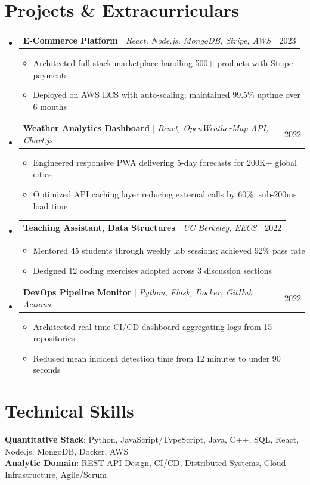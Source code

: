 \documentclass[letterpaper,11pt]{article}
\makeatletter
\newcommand{\resumeItem}[1]{
  \item\small{{#1 \vspace{-2pt}}}
}
\newcommand{\resumeProjectHeading}[2]{
    \item
    \begin{tabular*}{0.97\textwidth}{l@{\extracolsep{\fill}}r}
      \small#1 & #2 \\
    \end{tabular*}\vspace{-7pt}
}
\newcommand{\resumeSubHeadingListStart}{\begin{itemize}[leftmargin=0.15in, label={}]}
\newcommand{\resumeSubHeadingListEnd}{\end{itemize}}
\newcommand{\resumeItemListStart}{\begin{itemize}}
\newcommand{\resumeItemListEnd}{\end{itemize}\vspace{-5pt}}
\makeatother
\begin{document}
\section{Projects \& Extracurriculars}
    \resumeSubHeadingListStart
  \resumeProjectHeading
    {\textbf{E-Commerce Platform} $|$ \emph{React, Node.js, MongoDB, Stripe, AWS}}{2023}
    \resumeItemListStart
      \resumeItem{Architected full-stack marketplace handling 500+ products with Stripe payments}
      \resumeItem{Deployed on AWS ECS with auto-scaling; maintained 99.5\% uptime over 6 months}
    \resumeItemListEnd

  \resumeProjectHeading
    {\textbf{Weather Analytics Dashboard} $|$ \emph{React, OpenWeatherMap API, Chart.js}}{2022}
    \resumeItemListStart
      \resumeItem{Engineered responsive PWA delivering 5-day forecasts for 200K+ global cities}
      \resumeItem{Optimized API caching layer reducing external calls by 60\%; sub-200ms load time}
    \resumeItemListEnd

  \resumeProjectHeading
    {\textbf{Teaching Assistant, Data Structures} $|$ \emph{UC Berkeley, EECS}}{2022}
    \resumeItemListStart
      \resumeItem{Mentored 45 students through weekly lab sessions; achieved 92\% pass rate}
      \resumeItem{Designed 12 coding exercises adopted across 3 discussion sections}
    \resumeItemListEnd

  \resumeProjectHeading
    {\textbf{DevOps Pipeline Monitor} $|$ \emph{Python, Flask, Docker, GitHub Actions}}{2022}
    \resumeItemListStart
      \resumeItem{Architected real-time CI/CD dashboard aggregating logs from 15 repositories}
      \resumeItem{Reduced mean incident detection time from 12 minutes to under 90 seconds}
    \resumeItemListEnd
    \resumeSubHeadingListEnd

\section{Technical Skills}
 \begin{itemize}[leftmargin=0.15in, label={}]
    \small{\item{
     \textbf{Quantitative Stack}{: Python, JavaScript/TypeScript, Java, C++, SQL, React, Node.js, MongoDB, Docker, AWS} \\
     \textbf{Analytic Domain}{: REST API Design, CI/CD, Distributed Systems, Cloud Infrastructure, Agile/Scrum}
    }}
 \end{itemize}
\end{document}
